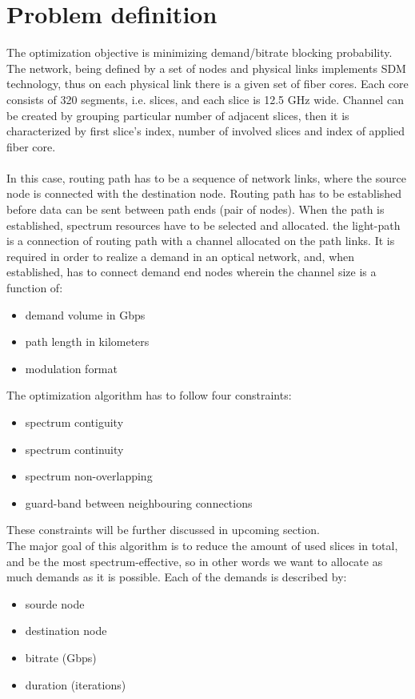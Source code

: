 \documentclass[conference]{IEEEtran}
\begin{document}
\section{Problem definition}
The optimization objective is minimizing demand/bitrate blocking probability. The network, being defined by a set of nodes and physical links implements SDM technology, thus on each physical link there is a given set of fiber cores. Each core consists of 320 segments, i.e. slices, and each slice is 12.5 GHz wide. Channel can be created by grouping particular number of adjacent slices, then it is characterized by first slice's index, number of involved slices and index of applied fiber core.
\\ \\
In this case, routing path has to be a sequence of network links, where the source node is connected with the destination node. Routing path has to be established before data can be sent between path ends (pair of nodes). When the path is established, spectrum resources have to be selected and allocated. the light-path is a connection of routing path with a channel allocated on the path links. It is required in order to realize a demand in an optical network, and, when established, has to connect demand end nodes wherein the channel size is a function of:
\begin{itemize}
\item demand volume in Gbps
\item path length in kilometers
\item modulation format
\end{itemize}
The optimization algorithm has to follow four constraints:
\begin{itemize}
\item spectrum contiguity
\item spectrum continuity
\item spectrum non-overlapping
\item guard-band between neighbouring connections
\end{itemize}
These constraints will be further discussed in upcoming section.
\\
The major goal of this algorithm is to reduce the amount of used slices in total, and be the most spectrum-effective, so in other words we want to allocate as much demands as it is possible. Each of the demands is described by:
\begin{itemize}
\item sourde node
\item destination node
\item bitrate (Gbps)
\item duration (iterations)
\end{itemize}
\end{document}
